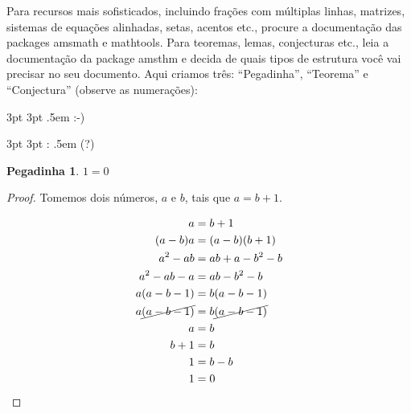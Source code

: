 Para recursos mais sofisticados, incluindo frações com múltiplas linhas,
matrizes, sistemas de equações alinhadas, setas, acentos etc., procure
a documentação das packages \textsf{amsmath} e \textsf{mathtools}. Para
teoremas, lemas, conjecturas etc., leia a documentação da package
\textsf{amsthm} e decida de quais tipos de estrutura você vai precisar
no seu documento. Aqui criamos três: ``Pegadinha'', ``Teorema'' e
``Conjectura'' (observe as numerações):

{3pt} %
{3pt} %
{\itshape} %
{} %
{\bfseries} %
{} %
{.5em} %
{ :-)\space} %

{3pt} %
{3pt} %
{\itshape} %
{} %
{\bfseries} %
{:} %
{.5em} %
{\space(?)} %

\theoremstyle{smile} %
\newtheorem{absurd}{Pegadinha}

\begin{absurd}\label{thm:doisum}
  $1=0$
\end{absurd}

\begin{proof}
Tomemos dois números, $a$ e $b$, tais que $a=b+1$.

\begin{displaymath}
  \begin{split}
    a &= b+1 \\
    (a-b)a &= (a-b)(b+1) \\
    a^2 - ab &= ab + a -b^2 -b \\
    a^2 -ab -a &= ab -b^2 -b \\
    a(a-b-1) &= b(a-b-1) \\
    a \cancel{(a-b-1)} &= b \cancel{(a-b-1)} \\
    a &= b \\
    b+1 &= b \\
    1 &= b-b \\
    1 &= 0
  \end{split}
\end{displaymath}
\end{proof}

